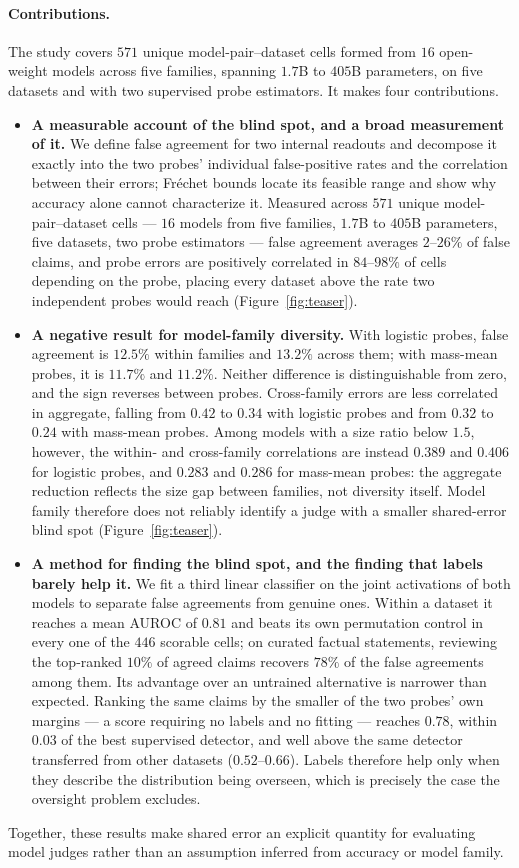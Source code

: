 \paragraph{Contributions.}
The study covers $571$ unique model-pair--dataset cells formed from $16$
open-weight models across five families, spanning $1.7$B to $405$B parameters,
on five datasets and with two supervised probe estimators. It makes four
contributions.

\begin{itemize}
\itemsep0em
\item \textbf{A measurable account of the blind spot, and a broad measurement of
  it.} We define false agreement for two internal readouts and decompose it
  exactly into the two probes' individual false-positive rates and the
  correlation between their errors; Fr\'echet bounds locate its feasible range
  and show why accuracy alone cannot characterize it. Measured across $571$
  unique model-pair--dataset cells --- $16$ models from five families, $1.7$B to
  $405$B parameters, five datasets, two probe estimators --- false agreement
  averages $2$--$26\%$ of false claims, and probe errors are positively
  correlated in $84$--$98\%$ of cells depending on the probe, placing every
  dataset above the rate two independent probes would reach
  (Figure~\ref{fig:teaser}).
\item \textbf{A negative result for model-family diversity.}
  With logistic probes, false agreement is $12.5\%$ within families and
  $13.2\%$ across them; with mass-mean probes, it is $11.7\%$ and $11.2\%$.
  Neither difference is distinguishable from zero, and the sign reverses between
  probes. Cross-family errors are less correlated in aggregate, falling from
  $0.42$ to $0.34$ with logistic probes and from $0.32$ to $0.24$ with mass-mean
  probes. Among models with a size ratio below $1.5$, however, the within- and
  cross-family correlations are instead $0.389$ and $0.406$ for logistic probes,
  and $0.283$ and $0.286$ for mass-mean probes: the aggregate reduction reflects
  the size gap between families, not diversity itself. Model family therefore
  does not reliably identify a judge with a smaller shared-error blind spot
  (Figure~\ref{fig:teaser}).
\item \textbf{A method for finding the blind spot, and the finding that labels
  barely help it.} We fit a third linear classifier on the joint activations of
  both models to separate false agreements from genuine ones. Within a dataset
  it reaches a mean AUROC of $0.81$ and beats its own permutation control in
  every one of the $446$ scorable cells; on curated factual statements,
  reviewing the top-ranked $10\%$ of agreed claims recovers $78\%$ of the false
  agreements among them. Its advantage over an untrained alternative is
  narrower than expected. Ranking the same claims by the smaller of the two
  probes' own margins --- a score requiring no labels and no fitting --- reaches
  $0.78$, within $0.03$ of the best supervised detector, and well above the same
  detector transferred from other datasets ($0.52$--$0.66$). Labels therefore
  help only when they describe the distribution being overseen, which is
  precisely the case the oversight problem excludes.
\end{itemize}

\noindent Together, these results make shared error an explicit quantity for
evaluating model judges rather than an assumption inferred from accuracy or
model family.

